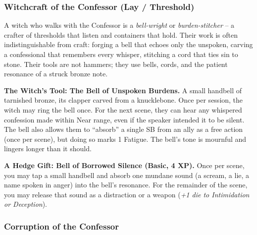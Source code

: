 \subsubsection*{Witchcraft of the Confessor (Lay / Threshold)}

A witch who walks with the Confessor is a \textit{bell-wright} or \textit{burden-stitcher} -- a crafter of thresholds that listen and containers that hold. Their work is often indistinguishable from craft: forging a bell that echoes only the unspoken, carving a confessional that remembers every whisper, stitching a cord that ties sin to stone. Their tools are not hammers; they use bells, cords, and the patient resonance of a struck bronze note.

\textbf{The Witch's Tool: The Bell of Unspoken Burdens.} A small handbell of tarnished bronze, its clapper carved from a knucklebone. Once per session, the witch may ring the bell once. For the next scene, they can hear any whispered confession made within Near range, even if the speaker intended it to be silent. The bell also allows them to ``absorb'' a single SB from an ally as a free action (once per scene), but doing so marks 1 Fatigue. The bell's tone is mournful and lingers longer than it should.

\textbf{A Hedge Gift: Bell of Borrowed Silence (Basic, 4 XP).} Once per scene, you may tap a small handbell and absorb one mundane sound (a scream, a lie, a name spoken in anger) into the bell's resonance. For the remainder of the scene, you may release that sound as a distraction or a weapon (\emph{+1 die to Intimidation or Deception}).

\subsubsection*{Corruption of the Confessor}

